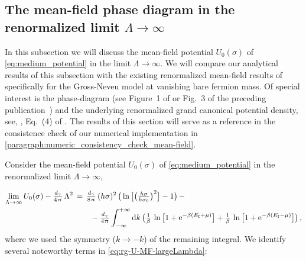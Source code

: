 \subsection{The mean-field phase diagram in the renormalized limit \texorpdfstring{$\Lambda\rightarrow\infty$}{}}
\label{subsec:phase_diagram_mean_field}
In this subsection we will discuss the mean-field potential $U_0 ( \sigma )$ of \cref{eq:medium_potential} in the limit $\Lambda\rightarrow\infty$.
We will compare our analytical results of this subsection with the existing renormalized mean-field results of specifically  for the Gross-Neveu model at vanishing bare fermion mass.
Of special interest is the phase-diagram (see Figure~1 of  or Fig.~3 of the preceding publication~\cite{Wolff:1985av}) and the underlying renormalized grand canonical potential density, see, \eg{}, Eq.~(4) of .
The results of this section will serve as a reference in the consistence check of our numerical implementation in \cref{paragraph:numeric_consistency_check_mean-field}.\bigskip

Consider the mean-field potential $U_0(\sigma)$ of \cref{eq:medium_potential} in the renormalized limit $\Lambda\rightarrow\infty$,

\begin{align}
	\lim_{\Lambda \rightarrow \infty} U_0(\sigma) - \tfrac{d_\gamma }{4\piu} \, \Lambda^2\, &=\, \tfrac{d_\gamma}{8 \piu} \, ( h \sigma )^2 \, \big( \ln \big[ \big( \tfrac{h \sigma}{h \sigma_0} \big)^2 \big] - 1 \big)\,- \notag \\* %
	&\qquad - \tfrac{d_\gamma}{4 \piu} \int_{-\infty}^{+\infty} \dif k \, \big( \tfrac{1}{\beta} \, \ln \big[ 1 + \eu^{- \beta ( E_\mathrm{f} + \mu )} \big] + \tfrac{1}{\beta} \, \ln \big[ 1 + \eu^{- \beta ( E_\mathrm{f} - \mu )} \big] \big) \, ,		\label{eq:rg-U-MF-largeLambda}
\end{align}
where we used the symmetry ($k \rightarrow - k$) of the remaining integral.
We identify several noteworthy terms in \cref{eq:rg-U-MF-largeLambda}:

